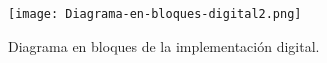 \begin{figure}[H]
	\centering
	\texttt{[image: Diagrama-en-bloques-digital2.png]}
	\caption{Diagrama en bloques de la implementación digital.}
	\label{fig:diag-en-bloques-digital}
\end{figure}


%


%

